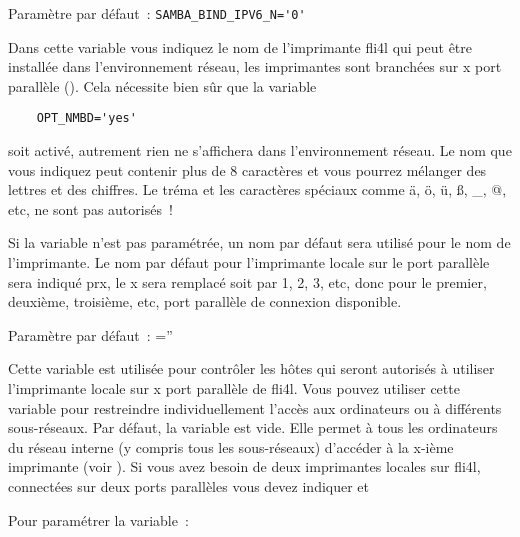 \begin{description}
    Paramètre par défaut~: \verb+SAMBA_BIND_IPV6_N='0'+



    Dans cette variable vous indiquez le nom de l'imprimante fli4l qui peut
    être installée dans l'environnement réseau, les imprimantes sont branchées
    sur x port parallèle ().
    Cela nécessite bien sûr que la variable

\begin{example}
\begin{verbatim}
    OPT_NMBD='yes'
\end{verbatim}
\end{example}

    soit activé, autrement rien ne s'affichera dans l'environnement réseau. Le
    nom que vous indiquez peut contenir plus de 8 caractères et vous pourrez
    mélanger des lettres et des chiffres. Le tréma et les caractères spéciaux
    comme ä, ö, ü, ß, \_, @, etc, ne sont pas autorisés~!

    Si la variable n'est pas paramétrée, un nom par défaut sera utilisé pour le
    nom de l'imprimante. Le nom par défaut pour l'imprimante locale sur le port
    parallèle sera indiqué prx, le x sera remplacé soit par 1, 2, 3, etc, donc
    pour le premier, deuxième, troisième, etc, port parallèle de connexion disponible.

    Paramètre par défaut~: =''



    Cette variable est utilisée pour contrôler les hôtes qui seront autorisés
    à utiliser l'imprimante locale sur x port parallèle de fli4l. Vous pouvez
    utiliser cette variable pour restreindre individuellement l'accès aux
    ordinateurs ou à différents sous-réseaux. Par défaut, la variable est vide.
    Elle permet à tous les ordinateurs du réseau interne (y compris tous les
    sous-réseaux) d'accéder à la x-ième imprimante (voir ).
    Si vous avez besoin de deux imprimantes locales sur fli4l, connectées sur
    deux ports parallèles vous devez indiquer \textbf{}
    et \textbf{}

    Pour paramétrer la variable~:


\end{description}
